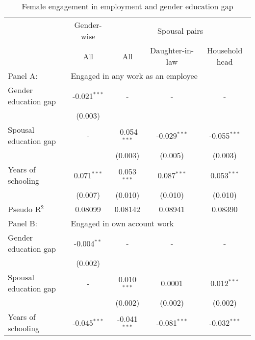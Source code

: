 
\begin{table}[htb]
	\caption{Female engagement in employment and gender education gap}
	\centering
\begin{tabular}{lcccc}\midrule \midrule
   & Gender-wise & \multicolumn{3}{c}{Spousal pairs} \\
   \cmidrule(l{3pt}r{3pt}){2-2} \cmidrule(l{3pt}r{3pt}){3-5}		
                  & All                     & All                     & Daughter-in-law 			   & Household head\\  
   \midrule
   Panel A:& \multicolumn{4}{l}{Engaged in any work as an employee}\\
   \midrule
   Gender education gap  & -0.021$^{***}$          &   -                     &   -                     &  -\\   
                         & (0.003)                 &                         &                         &   \\   
   Spousal education gap & -                       & -0.054$^{***}$          & -0.029$^{***}$ 		   & -0.055$^{***}$\\   
                         &                         & (0.003)                 & (0.005) 				   & (0.003) \\   
   Years of schooling    & 0.071$^{***}$           & 0.053$^{***}$           & 0.087$^{***}$ 		   & 0.053$^{***}$ \\   
                         & (0.007)                 & (0.010)                 & (0.010) 				   & (0.010)\\     
   \midrule    
   Pseudo R$^2$          & 0.08099                 & 0.08142                 & 0.08941 				   & 0.08390\\ 
   \midrule   
   \midrule
   Panel B:& \multicolumn{4}{l}{Engaged in own account work}\\
   \midrule
   Gender education gap  & -0.004$^{**}$           &  -                      &  -                      & - \\   
   					  	 & (0.002)                 &                         &                         &   \\   
   Spousal education gap & -                       & 0.010$^{***}$           & 0.0001				   & 0.012$^{***}$ \\   
   						 &                         & (0.002)                 & (0.002)				   & (0.002)\\  
   Years of schooling    & -0.045$^{***}$          & -0.041$^{***}$          & -0.081$^{***}$		   & -0.032$^{***}$ \\   

\end{tabular}
\end{table}
